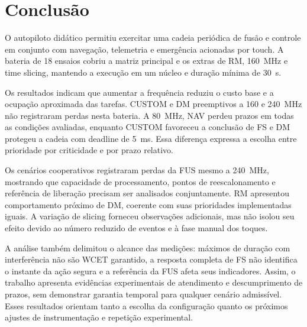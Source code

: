 \section{Conclusão}
\label{sec:conclusao}

O autopiloto didático permitiu exercitar uma cadeia periódica de fusão e controle em conjunto com navegação, telemetria e emergência acionadas por touch. A bateria de 18 ensaios cobriu a matriz principal e os extras de RM, 160~MHz e time slicing, mantendo a execução em um núcleo e duração mínima de 30~s.

Os resultados indicam que aumentar a frequência reduziu o custo base e a ocupação aproximada das tarefas. CUSTOM e DM preemptivos a 160 e 240~MHz não registraram perdas nesta bateria. A 80~MHz, NAV perdeu prazos em todas as condições avaliadas, enquanto CUSTOM favoreceu a conclusão de FS e DM protegeu a cadeia com deadline de 5~ms. Essa diferença expressa a escolha entre prioridade por criticidade e por prazo relativo.

Os cenários cooperativos registraram perdas da FUS mesmo a 240~MHz, mostrando que capacidade de processamento, pontos de reescalonamento e referência de liberação precisam ser analisados conjuntamente. RM apresentou comportamento próximo de DM, coerente com suas prioridades implementadas iguais. A variação de slicing forneceu observações adicionais, mas não isolou seu efeito devido ao número reduzido de eventos e à fase manual dos toques.

A análise também delimitou o alcance das medições: máximos de duração com interferência não são WCET garantido, a resposta completa de FS não identifica o instante da ação segura e a referência da FUS afeta seus indicadores. Assim, o trabalho apresenta evidências experimentais de atendimento e descumprimento de prazos, sem demonstrar garantia temporal para qualquer cenário admissível. Esses resultados orientam tanto a escolha da configuração quanto os próximos ajustes de instrumentação e repetição experimental.
